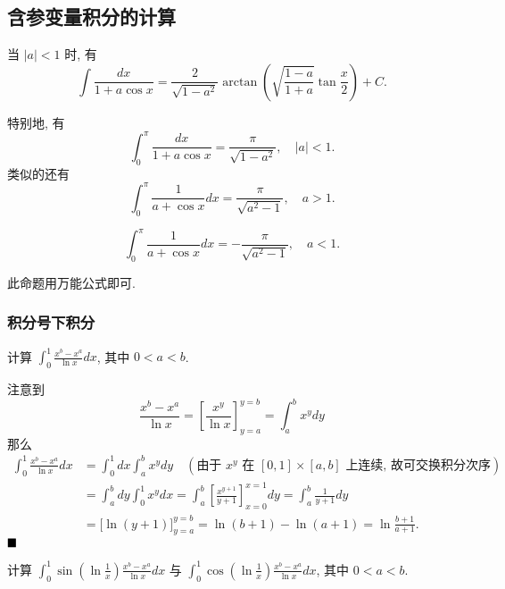 \documentclass[lang=cn,newtx,10pt,scheme=chinese]{elegantbook}
\begin{document}
\subsection{含参变量积分的计算}
\begin{proposition}
当 $|a|<1$ 时, 有
\begin{equation*}
\int \frac{dx}{1+a\cos x} = \frac{2}{\sqrt{1-a^2}} \arctan\left(\sqrt{\frac{1-a}{1+a}}\tan\frac{x}{2}\right) + C. 
\end{equation*}

特别地, 有
\begin{equation*}
\int_{0}^{\pi} \frac{dx}{1+a\cos x} = \frac{\pi}{\sqrt{1-a^2}}, \quad |a|<1. 
\end{equation*}
类似的还有
$$
\int_{0}^{\pi} \frac{1}{a + \cos x} dx = \frac{\pi}{\sqrt{a^2 - 1}}, \quad a > 1.
$$

$$
\int_{0}^{\pi} \frac{1}{a + \cos x} dx =  - \frac{\pi}{\sqrt{a^2 - 1}}, \quad a < 1.
$$
\end{proposition}
\begin{remark}
    此命题用万能公式即可.
\end{remark}

\subsubsection{积分号下积分}

\begin{example}
计算 $\int_0^1 \frac{x^b - x^a}{\ln x} dx$, 其中 $0 < a < b$.
\end{example}

\begin{solution}
注意到 $$\frac{x^b - x^a}{\ln x} = \left[ \frac{x^y}{\ln x} \right]_{y=a}^{y=b} = \int_a^b x^y dy$$
那么
\begin{align*}
\int_0^1 \frac{x^b - x^a}{\ln x} dx &= \int_0^1 dx \int_a^b x^y dy \quad (\text{由于 } x^y \text{ 在 } [0,1] \times [a,b] \text{ 上连续, 故可交换积分次序}) \\
&= \int_a^b dy \int_0^1 x^y dx = \int_a^b \left[ \frac{x^{y+1}}{y+1} \right]_{x=0}^{x=1} dy = \int_a^b \frac{1}{y+1} dy \\
&= \big[ \ln(y+1) \big]_{y=a}^{y=b} = \ln(b+1) - \ln(a+1) = \ln\frac{b+1}{a+1}. 
\end{align*}
$ \hfill \blacksquare$
\end{solution}

\begin{example}
计算 $\int_0^1 \sin\left(\ln\frac{1}{x}\right)\frac{x^b - x^a}{\ln x}dx$ 与 $\int_0^1 \cos\left(\ln\frac{1}{x}\right)\frac{x^b - x^a}{\ln x}dx$, 其中 $0 < a < b$.
\end{example}
\end{document}
